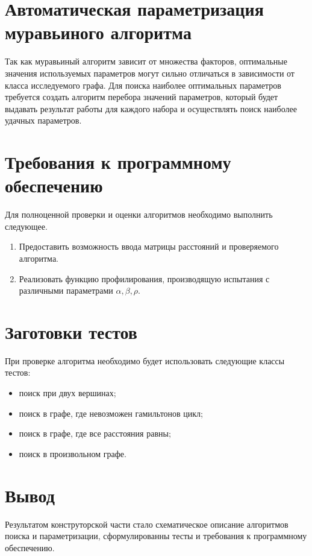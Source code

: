 \section{Автоматическая параметризация муравьиного алгоритма}
Так как муравьиный алгоритм зависит от множества факторов, оптимальные значения используемых параметров могут сильно отличаться в зависимости от класса исследуемого графа. Для поиска наиболее оптимальных параметров требуется создать алгоритм перебора значений параметров, который будет выдавать результат работы для каждого набора и осуществлять поиск наиболее удачных параметров.


\section{Требования к программному обеспечению}
Для полноценной проверки и оценки алгоритмов необходимо выполнить следующее.
\begin{enumerate}
	\item Предоставить возможность ввода матрицы расстояний и проверяемого алгоритма.
	\item Реализовать функцию профилирования, производящую испытания с различными параметрами $\alpha, \beta, \rho$.
\end{enumerate}


\section{Заготовки тестов}
При проверке алгоритма необходимо будет использовать следующие классы тестов:
\begin{itemize}
	\item поиск при двух вершинах;
	\item поиск в графе, где невозможен гамильтонов цикл;
	\item поиск в графе, где все расстояния равны;
	\item поиск в произвольном графе.
\end{itemize}

\section*{Вывод}
Результатом конструторской части стало схематическое описание алгоритмов поиска и параметризации, сформулированны тесты и требования к программному обеспечению.



